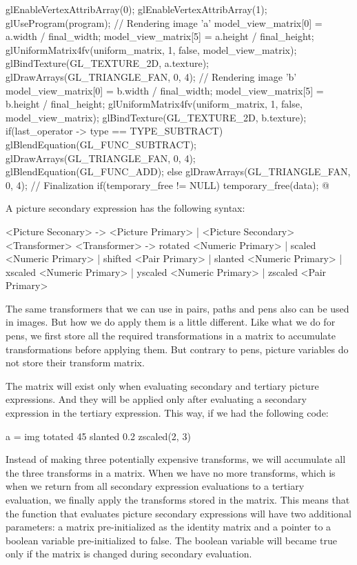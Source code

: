 glEnableVertexAttribArray(0);
glEnableVertexAttribArray(1);
glUseProgram(program);
// Rendering image 'a'
model_view_matrix[0] = a.width / final_width;
model_view_matrix[5] = a.height / final_height;
glUniformMatrix4fv(uniform_matrix, 1, false, model_view_matrix);
glBindTexture(GL_TEXTURE_2D, a.texture);
glDrawArrays(GL_TRIANGLE_FAN, 0, 4);
// Rendering image 'b'
model_view_matrix[0] = b.width / final_width;
model_view_matrix[5] = b.height / final_height;
glUniformMatrix4fv(uniform_matrix, 1, false, model_view_matrix);
glBindTexture(GL_TEXTURE_2D, b.texture);
if(last_operator -> type == TYPE_SUBTRACT){
  glBlendEquation(GL_FUNC_SUBTRACT);
  glDrawArrays(GL_TRIANGLE_FAN, 0, 4);
  glBlendEquation(GL_FUNC_ADD);
}
else
  glDrawArrays(GL_TRIANGLE_FAN, 0, 4);
// Finalization
if(temporary_free != NULL)
  temporary_free(data);
@
\fimcodigo


A picture secondary expression has the following syntax:

\alinhaverbatim
<Picture Seconary> -> <Picture Primary> |
                      <Picture Secondary><Transformer>
<Transformer> -> rotated <Numeric Primary> |
                 scaled <Numeric Primary> |
                 shifted <Pair Primary> |
                 slanted <Numeric Primary> |
                 xscaled <Numeric Primary> |
                 yscaled <Numeric Primary> |
                 zscaled <Pair Primary>
\alinhanormal

The same transformers that we can use in pairs, paths and pens also
can be used in images. But how we do apply them is a little
different. Like what we do for pens, we first store all the required
transformations in a matrix to accumulate transformations before
applying them. But contrary to pens, picture variables do not store
their transform matrix.

The matrix will exist only when evaluating secondary and tertiary
picture expressions. And they will be applied only after evaluating a
secondary expression in the tertiary expression. This way, if we had
the following code:

\alinhaverbatim
a = img totated 45 slanted 0.2 zscaled(2, 3)
\alinhanormal

Instead of making three potentially expensive transforms, we will
accumulate all the three transforms in a matrix. When we have no more
transforms, which is when we return from all secondary expression
evaluations to a tertiary evaluation, we finally apply the transforms
stored in the matrix. This means that the function that evaluates
picture secondary expressions will have two additional parameters: a
matrix pre-initialized as the identity matrix and a pointer to a
boolean variable pre-initialized to false. The boolean variable will
became true only if the matrix is changed during secondary evaluation.

